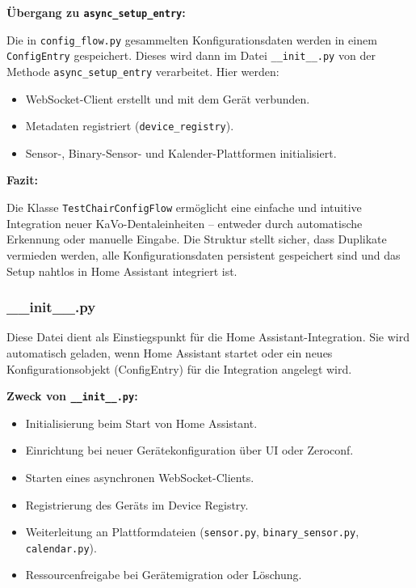 \vspace{0.5cm}

\textbf{Übergang zu \texttt{async\_setup\_entry}:}

Die in \texttt{config\_flow.py} gesammelten Konfigurationsdaten werden in einem \texttt{ConfigEntry} gespeichert. Dieses wird dann im Datei \texttt{\_\_init\_\_.py} von der Methode \texttt{async\_setup\_entry} verarbeitet. Hier werden:

\begin{itemize}
\item WebSocket-Client erstellt und mit dem Gerät verbunden.\\
\item Metadaten registriert (\texttt{device\_registry}).\\
\item Sensor-, Binary-Sensor- und Kalender-Plattformen initialisiert.
\end{itemize}

\vspace{0.5cm}

\textbf{Fazit:}

Die Klasse \texttt{TestChairConfigFlow} ermöglicht eine einfache und intuitive Integration neuer KaVo-Dentaleinheiten – entweder durch automatische Erkennung oder manuelle Eingabe. Die Struktur stellt sicher, dass Duplikate vermieden werden, alle Konfigurationsdaten persistent gespeichert sind und das Setup nahtlos in Home Assistant integriert ist.

\subsubsection{\_\_init\_\_.py}

Diese Datei dient als Einstiegspunkt für die Home Assistant-Integration. Sie wird automatisch geladen, wenn Home Assistant startet oder ein neues Konfigurationsobjekt (ConfigEntry) für die Integration angelegt wird.

\vspace{0.5cm}
\textbf{Zweck von \texttt{\_\_init\_\_.py}:}

\begin{itemize}
  \item Initialisierung beim Start von Home Assistant.\\
  \item Einrichtung bei neuer Gerätekonfiguration über UI oder Zeroconf.\\
  \item Starten eines asynchronen WebSocket-Clients.\\
  \item Registrierung des Geräts im Device Registry.\\
  \item Weiterleitung an Plattformdateien (\texttt{sensor.py}, \texttt{binary\_sensor.py}, \texttt{calendar.py}).\\
  \item Ressourcenfreigabe bei Gerätemigration oder Löschung.
\end{itemize}
\vspace{0.5cm}

